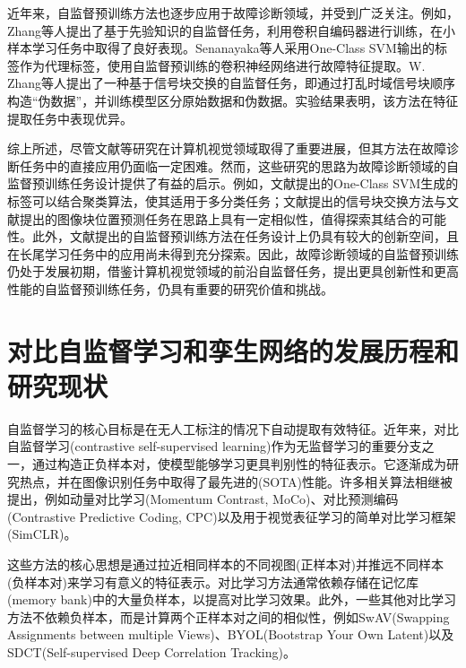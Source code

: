 \documentclass[master]{thesis-uestc}
\begin{document}
近年来，自监督预训练方法也逐步应用于故障诊断领域，并受到广泛关注。例如，Zhang等人提出了基于先验知识的自监督任务，利用卷积自编码器进行训练，在小样本学习任务中取得了良好表现。Senanayaka等人采用One-Class SVM输出的标签作为代理标签，使用自监督预训练的卷积神经网络进行故障特征提取。W. Zhang等人提出了一种基于信号块交换的自监督任务，即通过打乱时域信号块顺序构造“伪数据”，并训练模型区分原始数据和伪数据。实验结果表明，该方法在特征提取任务中表现优异。

综上所述，尽管文献\cite{doersch2015unsupervised, zhang2016colorful, gidaris2018unsupervised}等研究在计算机视觉领域取得了重要进展，但其方法在故障诊断任务中的直接应用仍面临一定困难。然而，这些研究的思路为故障诊断领域的自监督预训练任务设计提供了有益的启示。例如，文献\cite{senanayaka2020toward}提出的One-Class SVM生成的标签可以结合聚类算法，使其适用于多分类任务；文献\cite{zhang2021federated}提出的信号块交换方法与文献\cite{doersch2015unsupervised}提出的图像块位置预测任务在思路上具有一定相似性，值得探索其结合的可能性。此外，文献\cite{zhang2022prior, senanayaka2020toward, zhang2021federated}提出的自监督预训练方法在任务设计上仍具有较大的创新空间，且在长尾学习任务中的应用尚未得到充分探索。因此，故障诊断领域的自监督预训练仍处于发展初期，借鉴计算机视觉领域的前沿自监督任务，提出更具创新性和更高性能的自监督预训练任务，仍具有重要的研究价值和挑战。
\FloatBarrier  %
\section{对比自监督学习和孪生网络的发展历程和研究现状}

自监督学习的核心目标是在无人工标注的情况下自动提取有效特征。近年来，对比自监督学习(contrastive self-supervised learning)作为无监督学习的重要分支之一，通过构造正负样本对，使模型能够学习更具判别性的特征表示。它逐渐成为研究热点，并在图像识别任务中取得了最先进的(SOTA)性能。许多相关算法相继被提出，例如动量对比学习(Momentum Contrast, MoCo)、对比预测编码(Contrastive Predictive Coding, CPC)以及用于视觉表征学习的简单对比学习框架(SimCLR)。

这些方法的核心思想是通过拉近相同样本的不同视图(正样本对)并推远不同样本(负样本对)来学习有意义的特征表示。对比学习方法通常依赖存储在记忆库(memory bank)中的大量负样本，以提高对比学习效果。此外，一些其他对比学习方法不依赖负样本，而是计算两个正样本对之间的相似性，例如SwAV(Swapping Assignments between multiple Views)、BYOL(Bootstrap Your Own Latent)以及SDCT(Self-supervised Deep Correlation Tracking)。
\end{document}
